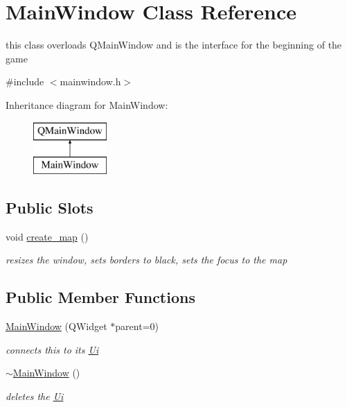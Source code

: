 \hypertarget{class_main_window}{}\section{Main\+Window Class Reference}
\label{class_main_window}


this class overloads Q\+Main\+Window and is the interface for the beginning of the game  




{\ttfamily \#include $<$mainwindow.\+h$>$}

Inheritance diagram for Main\+Window\+:\begin{figure}[H]
\begin{center}
\leavevmode
\includegraphics[height=2.000000cm]{class_main_window}
\end{center}
\end{figure}
\subsection*{Public Slots}
\begin{DoxyCompactItemize}
\item 
void \hyperlink{class_main_window_ae2383e5134b85deecf1ff824ac776b1e}{create\+\_\+map} ()
\begin{DoxyCompactList}\small\item\em resizes the window, sets borders to black, sets the focus to the map \end{DoxyCompactList}\end{DoxyCompactItemize}
\subsection*{Public Member Functions}
\begin{DoxyCompactItemize}
\item 
\hyperlink{class_main_window_a8b244be8b7b7db1b08de2a2acb9409db}{Main\+Window} (Q\+Widget $\ast$parent=0)
\begin{DoxyCompactList}\small\item\em connects this to its \hyperlink{namespace_ui}{Ui} \end{DoxyCompactList}\item 
\hyperlink{class_main_window_ae98d00a93bc118200eeef9f9bba1dba7}{$\sim$\+Main\+Window} ()
\begin{DoxyCompactList}\small\item\em deletes the \hyperlink{namespace_ui}{Ui} \end{DoxyCompactList}\end{DoxyCompactItemize}


